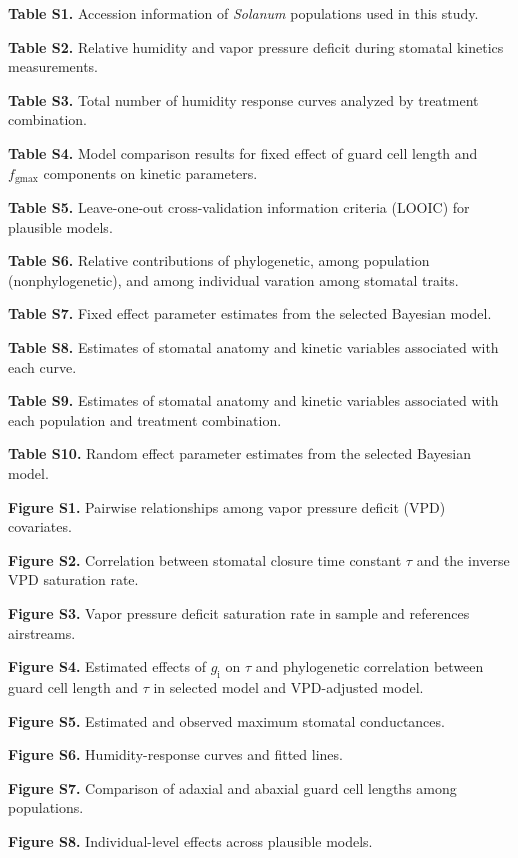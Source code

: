 \documentclass[
  letterpaper,
  DIV=11,
  numbers=noendperiod]{scrartcl}
\newcommand{\fgmax}{$f_\mathrm{gmax}$}
\begin{document}
\begin{flushleft}

\textbf{Table S1.} Accession information of \emph{Solanum} populations
used in this study.

\textbf{Table S2.} Relative humidity and vapor pressure deficit during
stomatal kinetics measurements.

\textbf{Table S3.} Total number of humidity response curves analyzed by
treatment combination.

\textbf{Table S4.} Model comparison results for fixed effect of guard
cell length and \fgmax{} components on kinetic parameters.

\textbf{Table S5.} Leave-one-out cross-validation information criteria
(LOOIC) for plausible models.

\textbf{Table S6.} Relative contributions of phylogenetic, among
population (nonphylogenetic), and among individual varation among
stomatal traits.

\textbf{Table S7.} Fixed effect parameter estimates from the selected
Bayesian model.

\textbf{Table S8.} Estimates of stomatal anatomy and kinetic variables
associated with each curve.

\textbf{Table S9.} Estimates of stomatal anatomy and kinetic variables
associated with each population and treatment combination.

\textbf{Table S10.} Random effect parameter estimates from the selected
Bayesian model.

\textbf{Figure S1.} Pairwise relationships among vapor pressure deficit
(VPD) covariates.

\textbf{Figure S2.} Correlation between stomatal closure time constant
\(\tau\) and the inverse VPD saturation rate.

\textbf{Figure S3.} Vapor pressure deficit saturation rate in sample and
references airstreams.

\textbf{Figure S4.} Estimated effects of \(g_\mathrm{i}\) on \(\tau\)
and phylogenetic correlation between guard cell length and \(\tau\) in
selected model and VPD-adjusted model.

\textbf{Figure S5.} Estimated and observed maximum stomatal
conductances.

\textbf{Figure S6.} Humidity-response curves and fitted lines.

\textbf{Figure S7.} Comparison of adaxial and abaxial guard cell lengths
among populations.

\textbf{Figure S8.} Individual-level effects across plausible models.


\end{flushleft}
\end{document}
